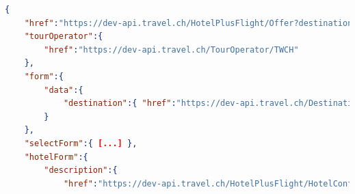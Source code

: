 \begin{lstlisting}[language=json,firstnumber=1]
{
    "href":"https://dev-api.travel.ch/HotelPlusFlight/Offer?destination=https%3A%2F%2Fdev-api.travel.ch%2FDestination%2FH_9675C54E32056B7DC2393EE1D758FEB9&offerHotelInformation=https%3A%2F%2Fdev-api.travel.ch%2FHotelInformation%2F46FFEA61-6A24-4FCB-AE6A-524CE6E752DF&hotelInformation=https%3A%2F%2Fdev-api.travel.ch%2FHotelInformation%2F46FFEA61-6A24-4FCB-AE6A-524CE6E752DF&periodOfStay.checkInDate=2016-10-05&periodOfStay.checkOutDate=2016-10-12&roomOccupancies%5B0%5D.dateOfBirths%5B0%5D=null&roomOccupancies%5B0%5D.dateOfBirths%5B1%5D=null&departureAirports%5B0%5D=https%3A%2F%2Fdev-api.travel.ch%2FDestination%2FA6299722&mealTypeCategories%5B0%5D=https%3A%2F%2Fdev-api.travel.ch%2FHotelMealTypeCategory%2FRoomOnly&mealTypeCategories%5B1%5D=https%3A%2F%2Fdev-api.travel.ch%2FHotelMealTypeCategory%2FBreakfast&mealTypeCategories%5B2%5D=https%3A%2F%2Fdev-api.travel.ch%2FHotelMealTypeCategory%2FHalfBoard&mealTypeCategories%5B3%5D=https%3A%2F%2Fdev-api.travel.ch%2FHotelMealTypeCategory%2FFullBoard&mealTypeCategories%5B4%5D=https%3A%2F%2Fdev-api.travel.ch%2FHotelMealTypeCategory%2FAllInclusive&tourOperators%5B0%5D=https%3A%2F%2Fdev-api.travel.ch%2FTourOperator%2FTWCH&tourOperators%5B1%5D=https%3A%2F%2Fdev-api.travel.ch%2FTourOperator%2FTOC&roomTypeCategories%5B0%5D=https%3A%2F%2Fdev-api.travel.ch%2FHotelRoomTypeCategory%2FHotelRoom&roomTypeCategories%5B1%5D=https%3A%2F%2Fdev-api.travel.ch%2FHotelRoomTypeCategory%2FStudio&roomTypeCategories%5B2%5D=https%3A%2F%2Fdev-api.travel.ch%2FHotelRoomTypeCategory%2FJuniorSuite&roomTypeCategories%5B3%5D=https%3A%2F%2Fdev-api.travel.ch%2FHotelRoomTypeCategory%2FApartment&roomTypeCategories%5B4%5D=https%3A%2F%2Fdev-api.travel.ch%2FHotelRoomTypeCategory%2FSuite&roomTypeCategories%5B5%5D=https%3A%2F%2Fdev-api.travel.ch%2FHotelRoomTypeCategory%2FBungalow&rooms%5B0%5D.HubBookingCode=DB-3D&flights%5B0%5D.HubId=2H&flights%5B1%5D.HubId=1I&flights%5B0%5D.HubCode=ZRHTXL&flights%5B1%5D.HubCode=TXLZRH",
    "tourOperator":{
        "href":"https://dev-api.travel.ch/TourOperator/TWCH"
    },
    "form":{
        "data":{
            "destination":{ "href":"https://dev-api.travel.ch/Destination/H_9675C54E32056B7DC2393EE1D758FEB9" }
        }
    },
    "selectForm":{ [...] },
    "hotelForm":{
        "description":{
            "href":"https://dev-api.travel.ch/HotelPlusFlight/HotelConfigurationFormDescription?offerHotelInformation=https%3A%2F%2Fdev-api.travel.ch%2FHotelInformation%2F46FFEA61-6A24-4FCB-AE6A-524CE6E752DF&roomOccupancies%5B0%5D.dateOfBirths%5B0%5D=null&roomOccupancies%5B0%5D.dateOfBirths%5B1%5D=null&departureAirports%5B0%5D=https%3A%2F%2Fdev-api.travel.ch%2FDestination%2FA6299722&rooms%5B0%5D.HubBookingCode=DB-3D&flights%5B0%5D.HubId=2H&flights%5B1%5D.HubId=1I&flights%5B0%5D.HubCode=ZRHTXL&flights%5B1%5D.HubCode=TXLZRH&periodOfStay.checkInDate=2016-10-05&periodOfStay.checkOutDate=2016-10-12"

\end{lstlisting}
